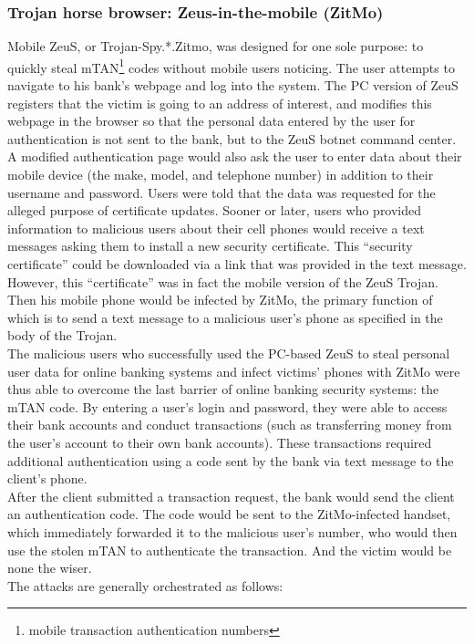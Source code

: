 \documentclass[12pt]{article}
\begin{document}
 \subsubsection{Trojan horse browser: Zeus-in-the-mobile (ZitMo)}
 Mobile ZeuS, or Trojan-Spy.*.Zitmo, was designed for one sole purpose: to quickly steal mTAN\footnote{mobile transaction authentication numbers} codes without mobile users noticing. The user attempts to navigate to  his bank’s webpage and log into the system. The PC version of ZeuS registers that the victim is going to an address of interest, and modifies this webpage in the browser so that the personal data entered by the user for authentication is not sent to the bank, but to the ZeuS botnet command center. A modified authentication page would also ask the user to enter data about their mobile device (the make, model, and telephone number) in addition to their username and password. Users were told that the data was requested for the alleged purpose of certificate updates. Sooner or later, users who provided information to malicious users about their cell phones would receive a text messages asking them to install a new security certificate. This “security certificate” could be downloaded via a link that was provided in the text message. However, this “certificate” was in fact the mobile version of the ZeuS Trojan. Then his mobile phone would be infected by ZitMo, the primary function of which is to send a text message to a malicious user’s phone as specified in the body of the Trojan.\\
 The malicious users who successfully used the PC-based ZeuS to steal personal user data for online banking systems and infect victims’ phones with ZitMo were thus able to overcome the last barrier of online banking security systems: the mTAN code. By entering a user’s login and password, they were able to access their bank accounts and conduct transactions (such as transferring money from the user’s account to their own bank accounts). These transactions required additional authentication using a code sent by the bank via text message to the client’s phone.\\
 After the client submitted a transaction request, the bank would send the client an authentication code. The code would be sent to the ZitMo-infected handset, which immediately forwarded it to the malicious user’s number, who would then use the stolen mTAN to authenticate the transaction. And the victim would be none the wiser.\\
 The attacks are generally orchestrated as follows:
\end{document}
